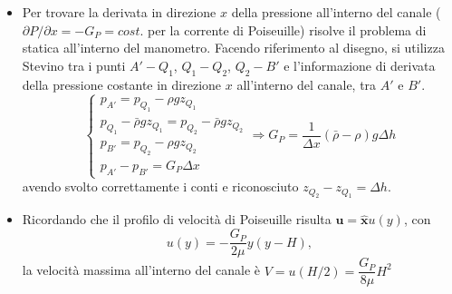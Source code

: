 \parttwo
\begin{itemize}
\item
Per trovare la derivata in direzione $x$ della pressione all'interno del
 canale ($\partial P/\partial x = - G_P = cost.$ per la corrente di Poiseuille) risolve il problema di statica all'interno del manometro.
Facendo riferimento al disegno, si utilizza Stevino tra i punti $A'-Q_1$,
 $Q_1-Q_2$, $Q_2-B'$ e l'informazione di derivata della pressione costante
 in direzione $x$ all'interno del canale, tra $A'$ e $B'$.
\begin{equation}
 \begin{cases}
  p_{A'} = p_{Q_1} - \rho g z_{Q_1} \\
  p_{Q_1} - \bar{\rho} g z_{Q_1} =   p_{Q_2} - \bar{\rho} g z_{Q_2} \\
  p_{B'} = p_{Q_2} - \rho g z_{Q_2} \\
  p_{A'} - p_{B'} = G_P \Delta x
 \end{cases} \Rightarrow
  G_P = \dfrac{1}{\Delta x}(\bar{\rho}-\rho) g \Delta h
\end{equation}
avendo svolto correttamente i conti e riconosciuto $z_{Q_2} - z_{Q_1} =
 \Delta h$.

\item
Ricordando che il profilo di velocità di Poiseuille risulta
 $\bm{u} = \bm{\hat{x}} u(y)$, con 
\begin{equation}
 u(y) = -\dfrac{G_P}{2 \mu} y (y-H),
\end{equation}
 la velocità massima all'interno del canale è $V = u(H/2) =
 \dfrac{G_P}{8 \mu} H^2$


\end{itemize}
